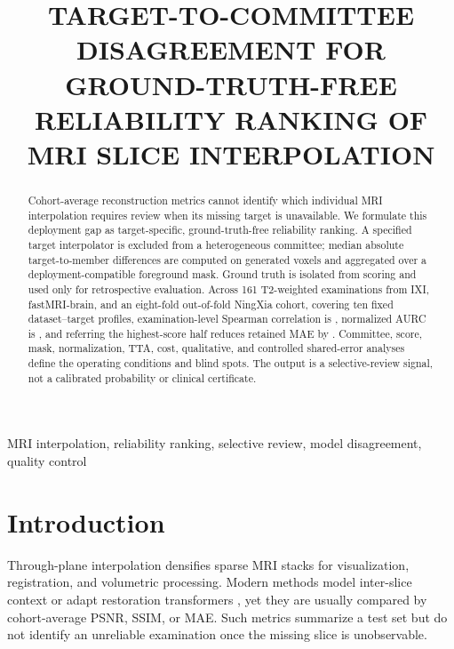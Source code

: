 \documentclass{article}
\title{TARGET-TO-COMMITTEE DISAGREEMENT FOR GROUND-TRUTH-FREE\\
RELIABILITY RANKING OF MRI SLICE INTERPOLATION}
\begin{document}
\ninept
\maketitle

\begin{abstract}
Cohort-average reconstruction metrics cannot identify which individual MRI interpolation requires review when its missing target is unavailable. We formulate this deployment gap as target-specific, ground-truth-free reliability ranking. A specified target interpolator is excluded from a heterogeneous committee; median absolute target-to-member differences are computed on generated voxels and aggregated over a deployment-compatible foreground mask. Ground truth is isolated from scoring and used only for retrospective evaluation. Across 161 T2-weighted examinations from IXI, fastMRI-brain, and an eight-fold out-of-fold NingXia cohort, covering ten fixed dataset--target profiles, examination-level Spearman correlation is \CaseSpearmanRange, normalized AURC is \NAURCRange, and referring the highest-score half reduces retained MAE by \RRRFiftyRange. Committee, score, mask, normalization, TTA, cost, qualitative, and controlled shared-error analyses define the operating conditions and blind spots. The output is a selective-review signal, not a calibrated probability or clinical certificate.
\end{abstract}

\begin{keywords}
MRI interpolation, reliability ranking, selective review, model disagreement, quality control
\end{keywords}

\section{Introduction}
Through-plane interpolation densifies sparse MRI stacks for visualization, registration, and volumetric processing. Modern methods model inter-slice context or adapt restoration transformers \cite{song2024i3net,liang2021swinir,chen2022hat}, yet they are usually compared by cohort-average PSNR, SSIM, or MAE. Such metrics summarize a test set but do not identify an unreliable examination once the missing slice is unobservable.
\end{document}
